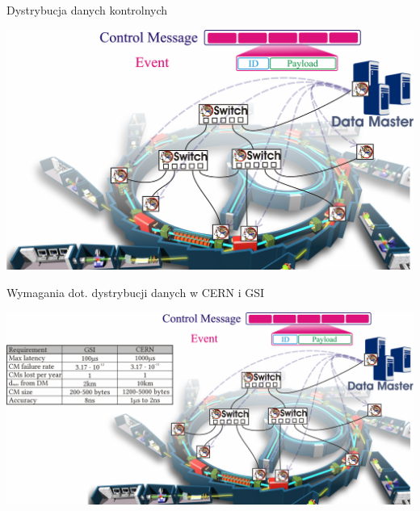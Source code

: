 \documentclass[compress,red]{beamer}
\begin{document}
\begin{frame}{Dystrybucja danych kontrolnych}

    \begin{center}
    \includegraphics[width=1.1\textwidth]{applications/CERN/WRControlNetwork.pdf}
    \end{center}


\end{frame}
\begin{frame}{Wymagania dot. dystrybucji danych w CERN i GSI}

    \begin{center}
    \includegraphics[width=1.1\textwidth]{applications/CERN/WRControlNetwork2.pdf}
    \end{center}


\end{frame}
\end{document}
